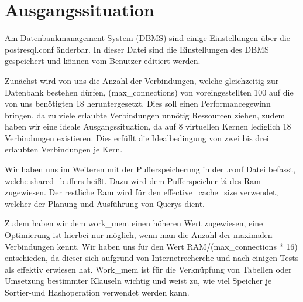 \section{Ausgangssituation}
Am Datenbankmanagement-System (DBMS) sind einige Einstellungen über die postresql.conf änderbar. In 
dieser Datei sind die Einstellungen des DBMS gespeichert und können vom Benutzer editiert werden. 

Zunächst wird von uns die Anzahl der Verbindungen, welche gleichzeitig zur Datenbank bestehen 
dürfen, (max_connections) von voreingestellten 100 auf die von uns benötigten 18 heruntergesetzt. 
Dies soll einen Performancegewinn bringen, da zu viele erlaubte Verbindungen unnötig Ressourcen 
ziehen, zudem haben wir eine ideale Ausgangssituation, da auf 8 virtuellen Kernen lediglich 18 
Verbindungen existieren. Dies erfüllt die Idealbedingung von zwei bis drei erlaubten Verbindungen 
je Kern.

Wir haben uns im Weiteren mit der Pufferspeicherung in der .conf Datei befasst, welche 
shared_buffers heißt. Dazu wird dem Pufferspeicher ¼ des Ram zugewiesen. Der restliche Ram wird 
für den effective_cache_size verwendet, welcher der Planung und Ausführung von Querys dient.  

Zudem haben wir dem work_mem einen höheren Wert zugewiesen, eine Optimierung ist hierbei nur 
möglich, wenn man die Anzahl der maximalen Verbindungen kennt. Wir haben uns für den Wert 
RAM/(max_connections * 16) entschieden, da dieser sich aufgrund von Internetrecherche und nach 
einigen Tests als effektiv erwiesen hat. Work_mem ist für die Verknüpfung von Tabellen oder 
Umsetzung bestimmter Klauseln wichtig und weist zu, wie viel Speicher je Sortier-und Hashoperation 
verwendet werden kann.


\clearpage